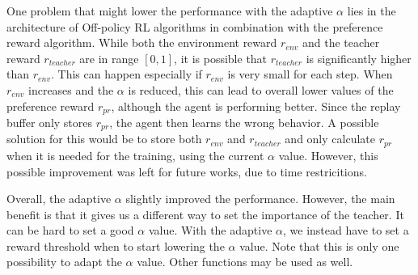 One problem that might lower the performance with the adaptive $\alpha$ lies in the architecture of Off-policy RL algorithms in combination with the preference reward algorithm. While both the environment reward $r_{env}$ and the teacher reward $r_{teacher}$ are in range $[0,1]$, it is possible that $r_{teacher}$ is significantly higher than $r_{env}$. This can happen especially if $r_{env}$ is very small for each step. When $r_{env}$ increases and the $\alpha$ is reduced, this can lead to overall lower values of the preference reward $r_{pr}$, although the agent is performing better. Since the replay buffer only stores $r_{pr}$, the agent then learns the wrong behavior. A possible solution for this would be to store both $r_{env}$ and $r_{teacher}$ and only calculate $r_{pr}$ when it is needed for the training, using the current $\alpha$ value. However, this possible improvement was left for future works, due to time restricitions.

Overall, the adaptive $\alpha$ slightly improved the performance. However, the main benefit is that it gives us a different way to set the importance of the teacher. It can be hard to set a good $\alpha$ value. With the adaptive $\alpha$, we instead have to set a reward threshold when to start lowering the $\alpha$ value. Note that this is only one possibility to adapt the $\alpha$ value. Other functions may be used as well.


